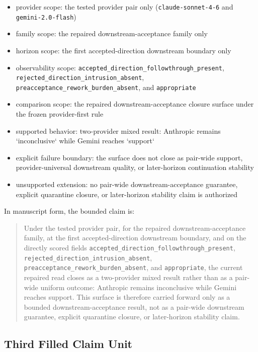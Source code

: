 \documentclass[11pt]{article}
\begin{document}
\begin{itemize}
\item provider scope:
  the tested provider pair only (\texttt{claude-sonnet-4-6} and
  \texttt{gemini-2.0-flash})
\item family scope:
  the repaired downstream-acceptance family only
\item horizon scope:
  the first accepted-direction downstream boundary only
\item observability scope:
  \texttt{accepted\_direction\_followthrough\_present},
  \texttt{rejected\_direction\_intrusion\_absent},
  \texttt{preacceptance\_rework\_burden\_absent}, and \texttt{appropriate}
\item comparison scope:
  the repaired downstream-acceptance closure surface under the frozen
  provider-first rule
\item supported behavior:
  two-provider mixed result:
  Anthropic remains `inconclusive` while Gemini reaches `support`
\item explicit failure boundary:
  the surface does not close as pair-wide support, provider-universal
  downstream quality, or later-horizon continuation stability
\item unsupported extension:
  no pair-wide downstream-acceptance guarantee, explicit quarantine closure, or
  later-horizon stability claim is authorized
\end{itemize}

In manuscript form, the bounded claim is:

\begin{quote}
Under the tested provider pair, for the repaired downstream-acceptance family,
at the first accepted-direction downstream boundary, and on the directly scored
fields
\texttt{accepted\_direction\_followthrough\_present},
\texttt{rejected\_direction\_intrusion\_absent},
\texttt{preacceptance\_rework\_burden\_absent}, and \texttt{appropriate}, the
current repaired read closes as a two-provider mixed result rather than as a
pair-wide uniform outcome: Anthropic remains inconclusive while Gemini reaches
support. This surface is therefore carried forward only as a bounded
downstream-acceptance result, not as a pair-wide downstream guarantee, explicit
quarantine closure, or later-horizon stability claim.
\end{quote}

\subsection{Third Filled Claim Unit}
\end{document}

